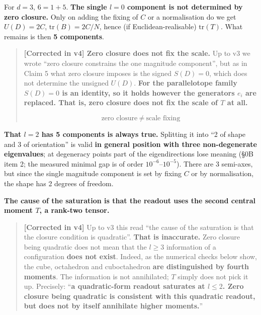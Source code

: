 \documentclass[
  10pt,
]{article}
\begin{document}
For \(d=3\), \(6 = 1 + 5\). \textbf{The single \(l=0\) component is not
determined by zero closure.} Only on adding the fixing of \(C\) or a
normalisation do we get \(U(D)=2C\), \(\mathrm{tr}(B)=2C/N\), hence (if
Euclidean-realisable) \(\mathrm{tr}(T)\). What remains is then \textbf{5
components}.

\begin{quote}
\textbf{{[}Corrected in v4{]} Zero closure does not fix the scale.} Up
to v3 we wrote ``zero closure constrains the one magnitude component'',
but as in Claim 5 what zero closure imposes is the signed \(S(D)=0\),
which does not determine the unsigned \(U(D)\). \textbf{For the
parallelotope family \(S(D)=0\) is an identity, so it holds however the
generators \(e_i\) are replaced. That is, zero closure does not fix the
scale of \(T\) at all.}

\[\boxed{\ \text{zero closure} \ \ne\ \text{scale fixing}\ }\]
\end{quote}

\textbf{That \(l=2\) has 5 components is always true.} Splitting it into
``2 of shape and 3 of orientation'' is valid \textbf{in general position
with three non-degenerate eigenvalues}; at degeneracy points part of the
eigendirections lose meaning (§0B item 2; the measured minimal gap is of
order \(10^{-6}\)--\(10^{-5}\)). There are 3 semi-axes, but since the
single magnitude component is set by fixing \(C\) or by normalisation,
the shape has 2 degrees of freedom.

\textbf{The cause of the saturation is that the readout uses the second
central moment \(T\), a rank-two tensor.}

\begin{quote}
\textbf{{[}Corrected in v4{]}} Up to v3 this read ``the cause of the
saturation is that the closure condition is quadratic''. \textbf{That is
inaccurate.} Zero closure being quadratic does not mean that the
\(l\ge3\) information of a configuration \textbf{does not exist}.
Indeed, as the numerical checks below show, the cube, octahedron and
cuboctahedron \textbf{are distinguished by fourth moments}. The
information is not annihilated; \(T\) simply does not pick it up.
Precisely: ``\textbf{a quadratic-form readout saturates at \(l\le2\).
Zero closure being quadratic is consistent with this quadratic readout,
but does not by itself annihilate higher moments.}''
\end{quote}
\end{document}
